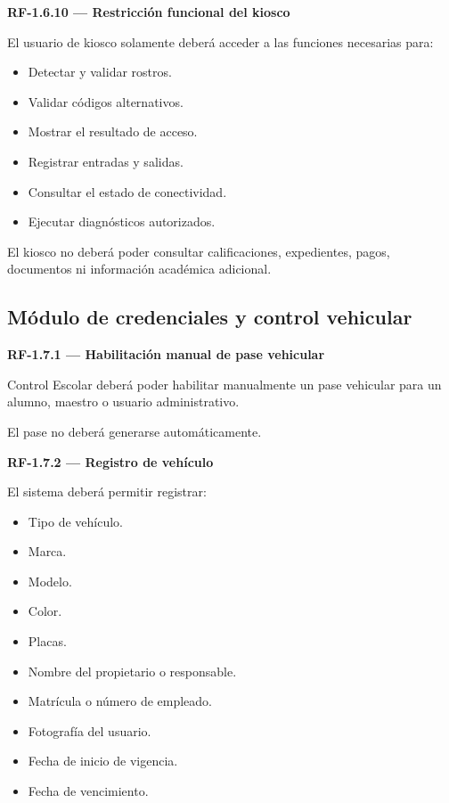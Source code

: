 \documentclass[12pt,a4paper]{article}
\newcommand{\RF}[1]{\textbf{\color{primary}RF-#1}}
\newenvironment{requisito}[1]
{
\begin{center}
\begin{minipage}{0.96\textwidth}
\colorbox{requirement}{
\begin{minipage}{0.94\textwidth}
\textbf{#1}
\end{minipage}
}
\vspace{2mm}
}
{
\end{minipage}
\end{center}
}
\begin{document}
\begin{requisito}{\RF{1.6.10} --- Restricción funcional del kiosco}
El usuario de kiosco solamente deberá acceder a las funciones necesarias para:

\begin{itemize}[leftmargin=*]
\item Detectar y validar rostros.
\item Validar códigos alternativos.
\item Mostrar el resultado de acceso.
\item Registrar entradas y salidas.
\item Consultar el estado de conectividad.
\item Ejecutar diagnósticos autorizados.
\end{itemize}

El kiosco no deberá poder consultar calificaciones, expedientes, pagos,
documentos ni información académica adicional.
\end{requisito}

\subsection{Módulo de credenciales y control vehicular}

\begin{requisito}{\RF{1.7.1} --- Habilitación manual de pase vehicular}
Control Escolar deberá poder habilitar manualmente un pase vehicular para un
alumno, maestro o usuario administrativo.

El pase no deberá generarse automáticamente.
\end{requisito}

\begin{requisito}{\RF{1.7.2} --- Registro de vehículo}
El sistema deberá permitir registrar:

\begin{itemize}[leftmargin=*]
\item Tipo de vehículo.
\item Marca.
\item Modelo.
\item Color.
\item Placas.
\item Nombre del propietario o responsable.
\item Matrícula o número de empleado.
\item Fotografía del usuario.
\item Fecha de inicio de vigencia.
\item Fecha de vencimiento.
\end{itemize}
\end{requisito}
\end{document}
